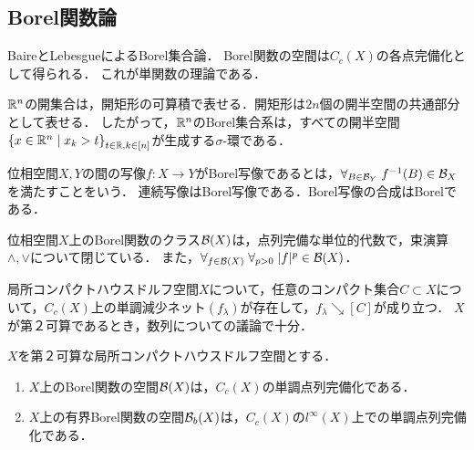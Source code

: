 \documentclass[uplatex,dvipdfmx]{jsreport}
\begin{document}
\subsection{Borel関数論}

\begin{tcolorbox}[colframe=ForestGreen, colback=ForestGreen!10!white,breakable,colbacktitle=ForestGreen!40!white,coltitle=black,fonttitle=\bfseries\sffamily,
title=単関数各点近似が出来るクラスが可測関数である]
    BaireとLebesgueによるBorel集合論．
    Borel関数の空間は$C_c(X)$の各点完備化として得られる．
    これが単関数の理論である．
\end{tcolorbox}

\begin{example}[Euclid空間のBorel集合]
    $\mathbb{R}^n$の開集合は，開矩形の可算積で表せる．開矩形は$2n$個の開半空間の共通部分として表せる．
    したがって，$\mathbb{R}^n$のBorel集合系は，すべての開半空間$\left\{x\in\mathbb{R}^n\mid x_k>t\right\}_{t\in\mathbb{R},k\in[n]}$が生成する$\sigma$-環である．
\end{example}

\begin{definition}
    位相空間$X,Y$の間の写像$f:X\to Y$がBorel写像であるとは，$\forall_{B\in\mathcal{B}_Y}\;f^{-1}(B)\in\mathcal{B}_X$を満たすことをいう．
    連続写像はBorel写像である．Borel写像の合成はBorelである．
\end{definition}

\begin{corollary}
    位相空間$X$上のBorel関数のクラス$\mathcal{B}(X)$は，点列完備な単位的代数で，束演算$\land,\lor$について閉じている．
    また，$\forall_{f\in\mathcal{B}(X)}\;\forall_{p>0}\;\lvert f\rvert^p\in\mathcal{B}(X)$．
\end{corollary}

\begin{lemma}[コンパクト集合の定義関数の近似]
    局所コンパクトハウスドルフ空間$X$について，任意のコンパクト集合$C\subset X$について，$C_c(X)$上の単調減少ネット$(f_\lambda)$が存在して，$f_\lambda\searrow[C]$が成り立つ．
    $X$が第２可算であるとき，数列についての議論で十分．
\end{lemma}

\begin{proposition}
    $X$を第２可算な局所コンパクトハウスドルフ空間とする．
    \begin{enumerate}
        \item $X$上のBorel関数の空間$\mathcal{B}(X)$は，$C_c(X)$の単調点列完備化である．
        \item $X$上の有界Borel関数の空間$\mathcal{B}_b(X)$は，$C_c(X)$の$l^\infty(X)$上での単調点列完備化である．
    \end{enumerate}
\end{proposition}
\end{document}
